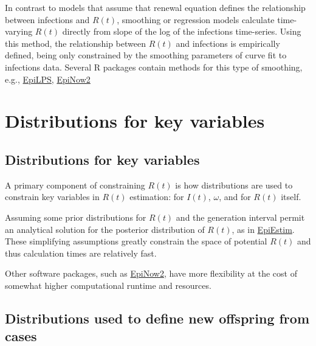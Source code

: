 \documentclass[
  letterpaper,
  DIV=11,
  numbers=noendperiod]{scrreprt}
\begin{document}

In contrast to models that assume that renewal equation defines the
relationship between infections and \(R(t)\), smoothing or regression
models calculate time-varying \(R(t)\) directly from slope of the log of
the infections time-series. Using this method, the relationship between
\(R(t)\) and infections is empirically defined, being only constrained
by the smoothing parameters of curve fit to infections data. Several R
packages contain methods for this type of smoothing, e.g.,
\href{package_EpiLPS.qmd}{EpiLPS}, \href{package_EpiNow2.qmd}{EpiNow2}

\chapter*{Distributions for key
variables}\label{distributions-for-key-variables}


\section*{Distributions for key
variables}\label{distributions-for-key-variables-1}


A primary component of constraining \(R(t)\) is how distributions are
used to constrain key variables in \(R(t)\) estimation: for \(I(t)\),
\(ω\), and for \(R(t)\) itself.

Assuming some prior distributions for \(R(t)\) and the generation
interval permit an analytical solution for the posterior distribution of
\(R(t)\), as in \href{package_EpiEstim.qmd}{EpiEstim}. These simplifying
assumptions greatly constrain the space of potential \(R(t)\) and thus
calculation times are relatively fast.

Other software packages, such as \href{package_EpiNow2.qmd}{EpiNow2},
have more flexibility at the cost of somewhat higher computational
runtime and resources.

\section*{Distributions used to define new offspring from
cases}\label{distributions-used-to-define-new-offspring-from-cases}
\end{document}
